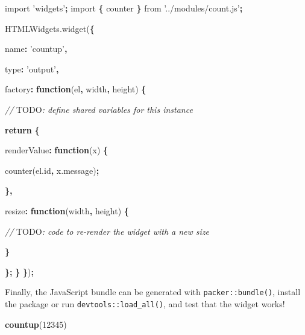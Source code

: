 \documentclass[10pt,]{krantz}
\makeatletter
\newenvironment{Shaded}{\begin{snugshade}}{\end{snugshade}}
\newcommand{\AlertTok}[1]{\textcolor[rgb]{0.33,0.33,0.33}{#1}}
\newcommand{\AttributeTok}[1]{\textcolor[rgb]{0.61,0.61,0.61}{#1}}
\newcommand{\CommentTok}[1]{\textcolor[rgb]{0.37,0.37,0.37}{\textit{#1}}}
\newcommand{\ControlFlowTok}[1]{\textcolor[rgb]{0.27,0.27,0.27}{\textbf{#1}}}
\newcommand{\DataTypeTok}[1]{\textcolor[rgb]{0.27,0.27,0.27}{#1}}
\newcommand{\DecValTok}[1]{\textcolor[rgb]{0.06,0.06,0.06}{#1}}
\newcommand{\ImportTok}[1]{#1}
\newcommand{\KeywordTok}[1]{\textcolor[rgb]{0.27,0.27,0.27}{\textbf{#1}}}
\newcommand{\NormalTok}[1]{#1}
\newcommand{\OperatorTok}[1]{\textcolor[rgb]{0.43,0.43,0.43}{\textbf{#1}}}
\newcommand{\StringTok}[1]{\textcolor[rgb]{0.5,0.5,0.5}{#1}}
\newcommand{\VariableTok}[1]{\textcolor[rgb]{0,0,0}{#1}}
\newenvironment{kframe}{%
\medskip{}
\setlength{\fboxsep}{.8em}
 \def\at@end@of@kframe{}%
 \ifinner\ifhmode%
  \def\at@end@of@kframe{\end{minipage}}%
  \begin{minipage}{\columnwidth}%
 \fi\fi%
 \def\FrameCommand##1{\hskip\@totalleftmargin \hskip-\fboxsep
 \colorbox{shadecolor}{##1}\hskip-\fboxsep
     \hskip-\linewidth \hskip-\@totalleftmargin \hskip\columnwidth}%
 \MakeFramed {\advance\hsize-\width
   \@totalleftmargin\z@ \linewidth\hsize
   \@setminipage}}%
 {\par\unskip\endMakeFramed%
 \at@end@of@kframe}
\renewenvironment{Shaded}{\begin{kframe}}{\end{kframe}}
\makeatother
\begin{document}
\begin{Shaded}
\begin{Highlighting}[]
\ImportTok{import} \StringTok{'widgets'}\OperatorTok{;}
\ImportTok{import} \OperatorTok{\{}\NormalTok{ counter }\OperatorTok{\}} \ImportTok{from} \StringTok{'../modules/count.js'}\OperatorTok{;} 

\VariableTok{HTMLWidgets}\NormalTok{.}\AttributeTok{widget}\NormalTok{(}\OperatorTok{\{}

  \DataTypeTok{name}\OperatorTok{:} \StringTok{'countup'}\OperatorTok{,}

  \DataTypeTok{type}\OperatorTok{:} \StringTok{'output'}\OperatorTok{,}

  \DataTypeTok{factory}\OperatorTok{:} \KeywordTok{function}\NormalTok{(el}\OperatorTok{,}\NormalTok{ width}\OperatorTok{,}\NormalTok{ height) }\OperatorTok{\{}

    \CommentTok{// }\AlertTok{TODO}\CommentTok{: define shared variables for this instance}

    \ControlFlowTok{return} \OperatorTok{\{}

      \DataTypeTok{renderValue}\OperatorTok{:} \KeywordTok{function}\NormalTok{(x) }\OperatorTok{\{}

        \AttributeTok{counter}\NormalTok{(}\VariableTok{el}\NormalTok{.}\AttributeTok{id}\OperatorTok{,} \VariableTok{x}\NormalTok{.}\AttributeTok{message}\NormalTok{)}\OperatorTok{;}

      \OperatorTok{\},}

      \DataTypeTok{resize}\OperatorTok{:} \KeywordTok{function}\NormalTok{(width}\OperatorTok{,}\NormalTok{ height) }\OperatorTok{\{}

        \CommentTok{// }\AlertTok{TODO}\CommentTok{: code to re-render the widget with a new size}

      \OperatorTok{\}}

    \OperatorTok{\};}
  \OperatorTok{\}}
\OperatorTok{\}}\NormalTok{)}\OperatorTok{;}
\end{Highlighting}
\end{Shaded}

Finally, the JavaScript bundle can be generated with \texttt{packer::bundle()}, install the package or run \texttt{devtools::load\_all()}, and test that the widget works!

\begin{Shaded}
\begin{Highlighting}[]
\KeywordTok{countup}\NormalTok{(}\DecValTok{12345}\NormalTok{)}
\end{Highlighting}
\end{Shaded}
\end{document}
